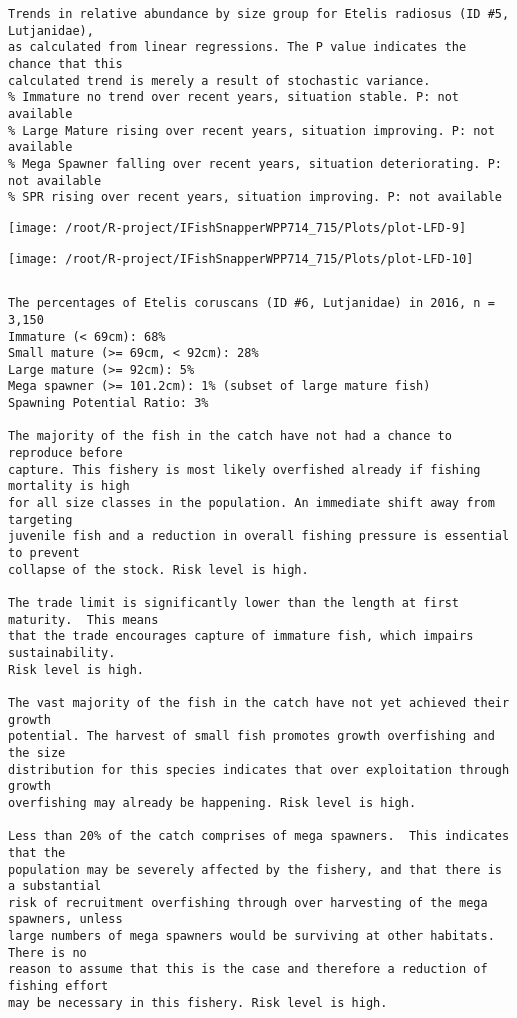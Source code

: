 \documentclass{report}\usepackage[]{graphicx}\usepackage[]{color}
\makeatletter
\def\maxwidth{ %
  \ifdim\Gin@nat@width>\linewidth
    \linewidth
  \else
    \Gin@nat@width
  \fi
}
\newenvironment{kframe}{%
 \def\at@end@of@kframe{}%
 \ifinner\ifhmode%
  \def\at@end@of@kframe{\end{minipage}}%
  \begin{minipage}{\columnwidth}%
 \fi\fi%
 \def\FrameCommand##1{\hskip\@totalleftmargin \hskip-\fboxsep
 \colorbox{shadecolor}{##1}\hskip-\fboxsep
     \hskip-\linewidth \hskip-\@totalleftmargin \hskip\columnwidth}%
 \MakeFramed {\advance\hsize-\width
   \@totalleftmargin\z@ \linewidth\hsize
   \@setminipage}}%
 {\par\unskip\endMakeFramed%
 \at@end@of@kframe}
\newenvironment{knitrout}{}{} %
\makeatother
\begin{document}
\begin{knitrout}
\begin{kframe}
\begin{verbatim}
Trends in relative abundance by size group for Etelis radiosus (ID #5, Lutjanidae),
as calculated from linear regressions. The P value indicates the chance that this
calculated trend is merely a result of stochastic variance.
% Immature no trend over recent years, situation stable. P: not available
% Large Mature rising over recent years, situation improving. P: not available
% Mega Spawner falling over recent years, situation deteriorating. P: not available
% SPR rising over recent years, situation improving. P: not available
\end{verbatim}
\end{kframe}
\texttt{[image: /root/R-project/IFishSnapperWPP714\_715/Plots/plot-LFD-9]} 

\texttt{[image: /root/R-project/IFishSnapperWPP714\_715/Plots/plot-LFD-10]} 
\begin{kframe}\begin{verbatim}
\end{verbatim}
\end{kframe}
\clearpage
\newpage
\begin{kframe}\begin{verbatim}The percentages of Etelis coruscans (ID #6, Lutjanidae) in 2016, n = 3,150
Immature (< 69cm): 68%
Small mature (>= 69cm, < 92cm): 28%
Large mature (>= 92cm): 5%
Mega spawner (>= 101.2cm): 1% (subset of large mature fish)
Spawning Potential Ratio: 3%
 
The majority of the fish in the catch have not had a chance to reproduce before
capture. This fishery is most likely overfished already if fishing mortality is high
for all size classes in the population. An immediate shift away from targeting
juvenile fish and a reduction in overall fishing pressure is essential to prevent
collapse of the stock. Risk level is high.

The trade limit is significantly lower than the length at first maturity.  This means
that the trade encourages capture of immature fish, which impairs sustainability.
Risk level is high.

The vast majority of the fish in the catch have not yet achieved their growth
potential. The harvest of small fish promotes growth overfishing and the size
distribution for this species indicates that over exploitation through growth
overfishing may already be happening. Risk level is high.

Less than 20% of the catch comprises of mega spawners.  This indicates that the
population may be severely affected by the fishery, and that there is a substantial
risk of recruitment overfishing through over harvesting of the mega spawners, unless
large numbers of mega spawners would be surviving at other habitats. There is no
reason to assume that this is the case and therefore a reduction of fishing effort
may be necessary in this fishery. Risk level is high.
 

\end{verbatim}
\end{kframe}
\end{knitrout}
\end{document}
